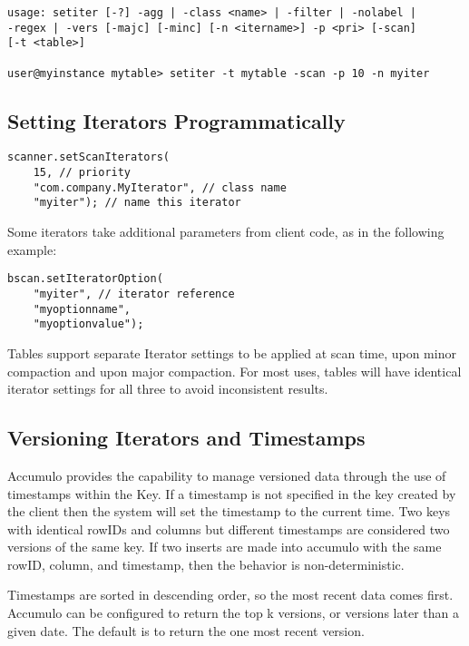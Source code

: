 \small
\begin{verbatim}
usage: setiter [-?] -agg | -class <name> | -filter | -nolabel | 
-regex | -vers [-majc] [-minc] [-n <itername>] -p <pri> [-scan] 
[-t <table>]

user@myinstance mytable> setiter -t mytable -scan -p 10 -n myiter
\end{verbatim}
\normalsize

\subsection{Setting Iterators Programmatically}

\small
\begin{verbatim}
scanner.setScanIterators(
    15, // priority
    "com.company.MyIterator", // class name
    "myiter"); // name this iterator
\end{verbatim}
\normalsize

Some iterators take additional parameters from client code, as in the following
example:

\small
\begin{verbatim}
bscan.setIteratorOption(
    "myiter", // iterator reference
    "myoptionname",
    "myoptionvalue");
\end{verbatim}
\normalsize

Tables support separate Iterator settings to be applied at scan time, upon minor
compaction and upon major compaction. For most uses, tables will have identical
iterator settings for all three to avoid inconsistent results.

\subsection{Versioning Iterators and Timestamps}

Accumulo provides the capability to manage versioned data through the use of
timestamps within the Key. If a timestamp is not specified in the key created by the
client then the system will set the timestamp to the current time. Two keys with
identical rowIDs and columns but different timestamps are considered two versions
of the same key. If two inserts are made into accumulo with the same rowID,
column, and timestamp, then the behavior is non-deterministic.

Timestamps are sorted in descending order, so the most recent data comes first.
Accumulo can be configured to return the top k versions, or versions later than a
given date. The default is to return the one most recent version.

